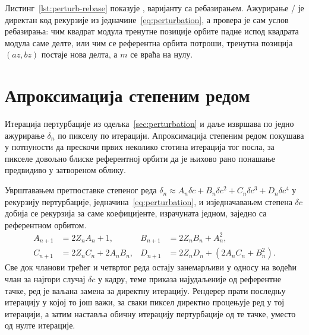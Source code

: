 \documentclass[serbian]{ftndiplomski}
\begin{document}
Листинг~\ref{lst:perturb-rebase} показује , варијанту
са ребазирањем. Ажурирање / је директан код рекурзије из
једначине~\ref{eq:perturbation}, а провера  је сам услов ребазирања: чим квадрат модула тренутне позиције орбите
падне испод квадрата модула саме делте, или чим се референтна орбита потроши,
тренутна позиција $(az, bz)$ постаје нова делта, а $m$ се враћа на нулу.

\noindent\begin{minipage}{\linewidth}

\end{minipage}

\section{Апроксимација степеним редом}
\label{sec:series-approximation}

Итерација пертурбације из одељка~\ref{sec:perturbation} и даље извршава по једно
ажурирање $\delta_n$ по пикселу по итерацији. Апроксимација степеним редом
\cite{martin2013superfractalthing, heilandallen2021deepzoom} покушава у потпуности да
прескочи првих неколико стотина итерација тог посла, за пикселе довољно блиске
референтној орбити да је њихово рано понашање предвидиво у затвореном облику.

Уврштавањем претпоставке степеног реда $\delta_n \approx A_n \delta c + B_n \delta c^2
+ C_n \delta c^3 + D_n \delta c^4$ у рекурзију пертурбације, једначина~\ref{eq:perturbation},
и изједначавањем степена $\delta c$ добија се рекурзија за саме коефицијенте,
израчуната једном, заједно са референтном орбитом.
\begin{align}
  \label{eq:sa-coefficients}
  A_{n+1} &= 2 Z_n A_n + 1, &
  B_{n+1} &= 2 Z_n B_n + A_n^2, \\
  C_{n+1} &= 2 Z_n C_n + 2 A_n B_n, &
  D_{n+1} &= 2 Z_n D_n + \left(2 A_n C_n + B_n^2\right).
\end{align}
Све док чланови трећег и четвртог реда остају занемарљиви у односу на водећи члан за
најгори случај $\delta c$ у кадру, теме приказа најудаљеније од референтне тачке,
ред је ваљана замена за директну итерацију. Рендерер прати последњу итерацију у којој
то још важи, за сваки пиксел директно процењује ред у тој итерацији, а затим наставља
обичну итерацију пертурбације од те тачке, уместо од нулте итерације.
\end{document}
